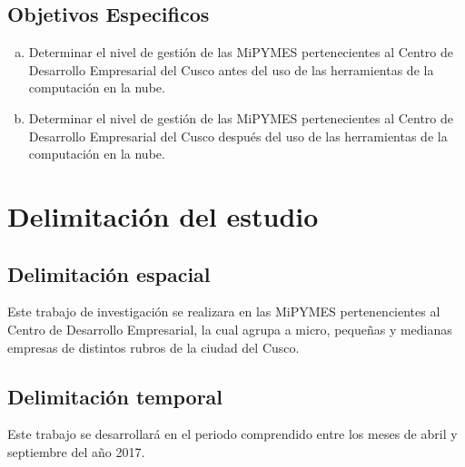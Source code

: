 \subsection{Objetivos Especificos}
\begin{enumerate}[a.]
\item Determinar el nivel de gestión de las MiPYMES pertenecientes al Centro de
Desarrollo Empresarial del Cusco antes del uso de las herramientas de la
computación en la nube.
\item Determinar el nivel de gestión de las MiPYMES pertenecientes al Centro de
Desarrollo Empresarial del Cusco después del uso de las herramientas de la
computación en la nube.
\end{enumerate}
\section{Delimitación del estudio}
\subsection{Delimitación espacial}
Este trabajo de investigación se realizara en las MiPYMES pertenencientes al
Centro de Desarrollo Empresarial, la cual agrupa a micro, pequeñas y
medianas empresas de distintos rubros de la ciudad del Cusco.

\subsection{Delimitación temporal}
Este trabajo se desarrollará en el periodo comprendido entre los meses de abril
y septiembre del año 2017.
